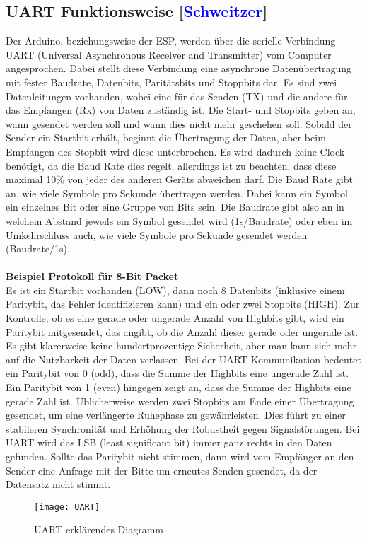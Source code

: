 \documentclass[titlepage,12pt,twoside]{article}
\begin{document}
\subsection{UART Funktionsweise [\textcolor{blue}{Schweitzer}]}
\label{chap:UART Funktionsweise}
Der Arduino, beziehungsweise der ESP, werden über die serielle Verbindung UART 
(Universal Asynchronous Receiver and Transmitter) vom Computer angesprochen. 
Dabei stellt diese Verbindung eine asynchrone Datenübertragung mit fester Baudrate, 
Datenbits, Paritätsbits und Stoppbits dar. Es sind zwei Datenleitungen vorhanden, wobei 
eine für das Senden (TX) und die andere für das Empfangen (Rx) von Daten zuständig ist. 
Die Start- und Stopbits geben an, wann gesendet werden soll und wann dies nicht 
mehr geschehen soll. Sobald der Sender ein Startbit erhält, beginnt die Übertragung 
der Daten, aber beim Empfangen des Stopbit wird diese unterbrochen. Es wird 
dadurch keine Clock benötigt, da die Baud Rate dies regelt, allerdings ist zu 
beachten, dass diese maximal 10\% von jeder des anderen Geräts abweichen darf. 
Die Baud Rate gibt an, wie viele Symbole pro Sekunde übertragen werden. Dabei 
kann ein Symbol ein einzelnes Bit oder eine Gruppe von Bits sein. Die Baudrate 
gibt also an in welchem Abstand jeweils ein Symbol gesendet wird (1s/Baudrate) 
oder eben im Umkehrschluss auch, wie viele Symbole pro Sekunde gesendet werden 
(Baudrate/1s). \\
\\
\textbf{Beispiel Protokoll für 8-Bit Packet} \\
Es ist ein Startbit vorhanden (LOW), dann noch 8 Datenbits (inklusive einem 
Paritybit, das Fehler identifizieren kann) und ein oder zwei Stopbits (HIGH). 
Zur Kontrolle, ob es eine gerade oder ungerade Anzahl von Highbits gibt, wird 
ein Paritybit mitgesendet, das angibt, ob die Anzahl dieser gerade oder ungerade 
ist. Es gibt klarerweise keine hundertprozentige Sicherheit, aber man kann sich 
mehr auf die Nutzbarkeit der Daten verlassen. Bei der UART-Kommunikation bedeutet 
ein Paritybit von 0 (odd), dass die Summe der Highbits eine ungerade Zahl ist. Ein 
Paritybit von 1 (even) hingegen zeigt an, dass die Summe der Highbits eine gerade 
Zahl ist. Üblicherweise werden zwei Stopbits am Ende einer Übertragung gesendet, 
um eine verlängerte Ruhephase zu gewährleisten. 
Dies führt zu einer stabileren Synchronität und Erhöhung der Robustheit gegen 
Signalstörungen. Bei UART wird das LSB (least significant bit) immer ganz rechts 
in den Daten gefunden. Sollte das Paritybit nicht stimmen, dann wird vom 
Empfänger an den Sender eine Anfrage mit der Bitte um erneutes Senden gesendet, 
da der Datensatz nicht stimmt. \\
\begin{figure}[H]
	\begin{center}
		\scalebox{0.5}
		{\texttt{[image: UART]}}
		\caption{UART erklärendes Diagramm}
		\label{fig:UART}		
	\end{center}
\end{figure}
\end{document}
